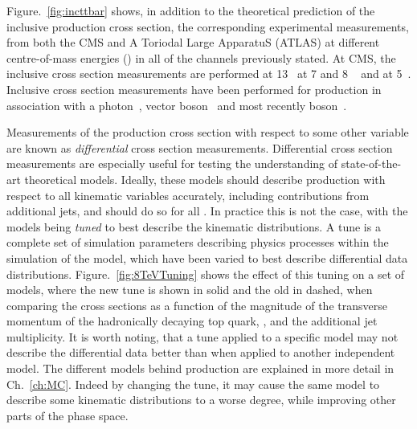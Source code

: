 Figure.~\ref{fig:incttbar} shows, in addition to the theoretical prediction of the inclusive \ttbar{} production cross section, the corresponding experimental measurements, from both the CMS and A Toriodal Large ApparatuS (ATLAS) at different centre-of-mass energies (\sqrts{}) in all of the channels previously stated.
At CMS, the inclusive \ttbar{} cross section measurements are performed at 13\TeV{}~\cite{TOP16005, TOP16006} at 7 and 8 \TeV{}~\cite{TOP10001, TOP10002, TOP10003, TOP11002, TOP11003, TOP11004, TOP11005, TOP12007, TOP12026, TOP12041, TOP13004, TOP14018} and at 5\TeV{}~\cite{TOP16023}.
Inclusive cross section measurements have been performed for \ttbar{} production in association with a photon~\cite{TOP14008}, vector boson~\cite{TOP17005} and most recently \Hboson{} boson~\cite{HIG17035}.

Measurements of the \ttbar{} production cross section with respect to some other variable are known as \textit{differential} cross section measurements.
Differential cross section measurements are especially useful for testing the understanding of state-of-the-art theoretical models.
Ideally, these models should describe \ttbar{} production with respect to all kinematic variables accurately, including contributions from additional jets, and should do so for all \sqrts{}.
In practice this is not the case, with the \ttbar{} models being \textit{tuned} to best describe the kinematic distributions.
A tune is a complete set of simulation parameters describing physics processes within the simulation of the model, which have been varied to best describe differential data distributions.
Figure.~\ref{fig:8TeVTuning} shows the effect of this tuning on a set of \ttbar{} models, where the new tune is shown in solid and the old in dashed, when comparing the cross sections as a function of the magnitude of the transverse momentum of the hadronically decaying top quark, \ptToph{}, and the additional jet multiplicity.
It is worth noting, that a tune applied to a specific model may not describe the differential data better than when applied to another independent model.
The different models behind \ttbar{} production are explained in more detail in Ch.~\ref{ch:MC}.
Indeed by changing the tune, it may cause the same model to describe some kinematic distributions to a worse degree, while improving other parts of the phase space.
